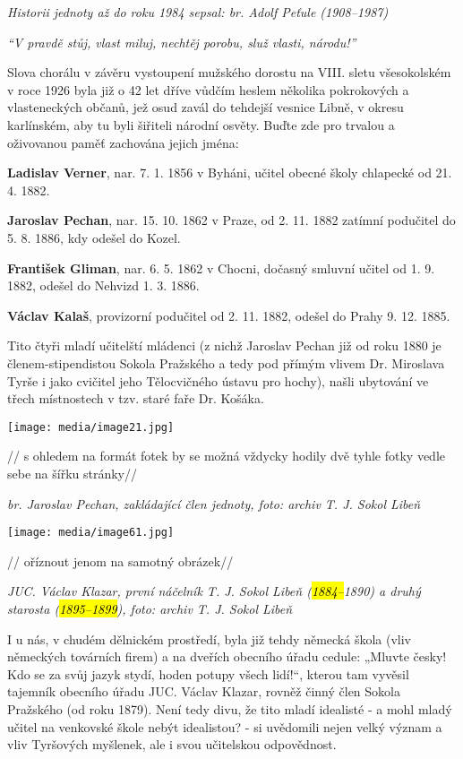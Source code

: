 \emph{Historii jednoty až do roku 1984 sepsal: br. Adolf Peťule
(1908--1987)}

\emph{``V pravdě stůj, vlast miluj, nechtěj porobu, služ vlasti,
národu!''}

Slova chorálu v závěru vystoupení mužského dorostu na VIII. sletu
všesokolském v roce 1926 byla již o 42 let dříve vůdčím heslem několika
pokrokových a vlasteneckých občanů, jež osud zavál do tehdejší vesnice
Libně, v okresu karlínském, aby tu byli šiřiteli národní osvěty. Buďte
zde pro trvalou a oživovanou paměť zachována jejich jména:

\textbf{Ladislav Verner}, nar. 7. 1. 1856 v Byháni, učitel obecné školy
chlapecké od 21. 4. 1882.

\textbf{Jaroslav Pechan}, nar. 15. 10. 1862 v Praze, od 2. 11. 1882
zatímní podučitel do 5. 8. 1886, kdy odešel do Kozel.

\textbf{František Gliman}, nar. 6. 5. 1862 v Chocni, dočasný smluvní
učitel od 1. 9. 1882, odešel do Nehvizd 1. 3. 1886.

\textbf{Václav Kalaš}, provizorní podučitel od 2. 11. 1882, odešel do
Prahy 9. 12. 1885.

Tito čtyři mladí učitelští mládenci (z nichž Jaroslav Pechan již od roku
1880 je členem-stipendistou Sokola Pražského a tedy pod přímým vlivem
Dr. Miroslava Tyrše i jako cvičitel jeho Tělocvičného ústavu pro hochy),
našli ubytování ve třech místnostech v tzv. staré faře Dr. Košáka.

\texttt{[image: media/image21.jpg]}

// s ohledem na formát fotek by se možná vždycky hodily dvě tyhle fotky
vedle sebe na šířku stránky//

\emph{br. Jaroslav Pechan, zakládající člen jednoty, foto: archiv T. J.
Sokol Libeň}

\texttt{[image: media/image61.jpg]}

// oříznout jenom na samotný obrázek//

\emph{JUC. Václav Klazar, první náčelník T. J. Sokol Libeň
(\hl{1884--⁠⁠⁠⁠⁠⁠}1890) a druhý starosta (\hl{1895--⁠⁠⁠⁠⁠⁠1899}), foto: archiv T. J.
Sokol Libeň}

I u nás, v chudém dělnickém prostředí, byla již tehdy německá škola
(vliv německých továrních firem) a na dveřích obecního úřadu cedule:
„Mluvte česky! Kdo se za svůj jazyk stydí, hoden potupy všech lidí!{}``,
kterou tam vyvěsil tajemník obecního úřadu JUC. Václav Klazar, rovněž
činný člen Sokola Pražského (od roku 1879). Není tedy divu, že tito
mladí idealisté - a mohl mladý učitel na venkovské škole nebýt
idealistou? - si uvědomili nejen velký význam a vliv Tyršových myšlenek,
ale i svou učitelskou odpovědnost.

